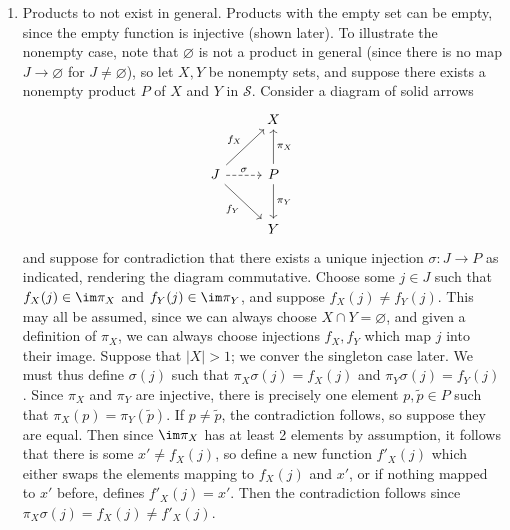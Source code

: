 \documentclass[11pt, letterpaper]{article}
\begin{document}
\begin{enumerate}
		To illustrate this, let $\left\{ n_j \right\}_{j\in \mathcal{J} }\subseteq \mathbb{Z} ^+ $ be an infinite collection indexed over some discrete category $\mathcal{J} $. Suppose for contradiction that there exists a coproduct $n$. We necessarily have $n_j|n$ for all $j$. It follows that $n_j \leq n$. By assumption, $n$ is finite. Thus, $n_j$ is finite for all $j$, since $n_j | n \implies n_j \leq n$. It follows that there are an infinite number of distinct $n_j$s which all have $0<n_j\leq n$, a contradiction since $\left\{ 1, \ldots ,n \right\} $ is a finite set.
	\item Products to not exist in general. Products with the empty set can be empty, since the empty function is injective (shown later). To illustrate the nonempty case, note that $\varnothing $ is not a product in general (since there is no map $J\to \varnothing $ for $J\neq \varnothing $), so let $X,Y$ be nonempty sets, and suppose there exists a nonempty product $P$ of $X$ and $Y$ in $\mathcal{S} $. Consider a diagram of solid arrows
		\[\begin{tikzcd}[row sep = 2.5em, column sep = 2.5em]
		 & X &  \\
		J \ar[" f_X ", ur] \ar[" f_Y "', dr] \ar[" \sigma  ", dashed, r]  & P \ar[" \pi _X "', u] \ar[" \pi _Y ", d]  &  \\
		 & Y & 
		\end{tikzcd}\]
		and suppose for contradiction that there exists a unique injection $\sigma : J \to P$ as indicated, rendering the diagram commutative. Choose some $j\in J$ such that $f_X(j)\in \im \pi _X$ and $f_Y(j)\in \im \pi _Y$, and suppose $f_X(j)\neq f_Y(j)$. This may all be assumed, since we can always choose $X \cap Y=\varnothing $, and given a definition of $\pi _X$, we can always choose injections $f_X,f_Y$ which map $j$ into their image. Suppose that $\left| X \right| >1$; we conver the singleton case later. We must thus define $\sigma (j)$ such that $\pi _X\sigma (j)=f_X(j)$ and $\pi _Y\sigma (j)=f_Y(j)$. Since $\pi _X$ and $\pi _Y$ are injective, there is precisely one element $p,\widetilde{p} \in P$ such that $\pi _X(p)=\pi _Y(\widetilde{p} )$. If $p\neq \widetilde{p} $, the contradiction follows, so suppose they are equal. Then since $\im \pi _X$ has at least 2 elements by assumption, it follows that there is some $x' \neq f_X(j)$, so define a new function $f'_X(j)$ which either swaps the elements mapping to $f_X(j)$ and $x'$, or if nothing mapped to $x'$ before, defines $f'_X(j)=x'$. Then the contradiction follows since $\pi _X\sigma (j)=f_X(j)\neq f'_X(j)$.


\end{enumerate}
\end{document}
